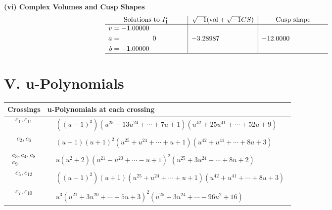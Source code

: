 \documentclass[1p]{elsarticle_modified}
\theoremstyle{definition}
\newcommand{\I}{\sqrt{-1}}
\begin{document}
\newpage\flushleft \textbf{(vi) Complex Volumes and Cusp Shapes}
$$\begin{array}{c|c|c}  
\text{Solutions to }I^v_{1}& \I (\text{vol} + \sqrt{-1}CS) & \text{Cusp shape}\\
 \hline 
\begin{aligned}
v &= -1.00000\phantom{ +0.000000I} \\
a &= \phantom{-0.000000 } 0 \\
b &= -1.00000\phantom{ +0.000000I}\end{aligned}
 & -3.28987\phantom{ +0.000000I} & -12.0000\phantom{ +0.000000I}\\
 \hline 
 \end{array}$$\newpage
\newpage\renewcommand{\arraystretch}{1}
\centering \section*{ V. u-Polynomials}
\begin{tabular}{m{50pt}|m{274pt}}
Crossings & \hspace{64pt}u-Polynomials at each crossing \\
\hline $$\begin{aligned}c_{1},c_{11}\end{aligned}$$&$\begin{aligned}
&((u-1)^3)(u^{25}+13 u^{24}+\cdots+7 u+1)(u^{42}+25 u^{41}+\cdots+52 u+9)
\end{aligned}$\\
\hline $$\begin{aligned}c_{2},c_{6}\end{aligned}$$&$\begin{aligned}
&(u-1)(u+1)^2(u^{25}+u^{24}+\cdots+u+1)(u^{42}+u^{41}+\cdots+8 u+3)
\end{aligned}$\\
\hline $$\begin{aligned}c_{3},c_{4},c_{8}\\c_{9}\end{aligned}$$&$\begin{aligned}
&u(u^2+2)(u^{21}- u^{20}+\cdots- u+1)^{2}(u^{25}+3 u^{24}+\cdots+8 u+2)
\end{aligned}$\\
\hline $$\begin{aligned}c_{5},c_{12}\end{aligned}$$&$\begin{aligned}
&((u-1)^2)(u+1)(u^{25}+u^{24}+\cdots+u+1)(u^{42}+u^{41}+\cdots+8 u+3)
\end{aligned}$\\
\hline $$\begin{aligned}c_{7},c_{10}\end{aligned}$$&$\begin{aligned}
&u^3(u^{21}+3 u^{20}+\cdots+5 u+3)^{2}(u^{25}+3 u^{24}+\cdots-96 u^2+16)
\end{aligned}$\\
\hline
\end{tabular}\newpage\renewcommand{\arraystretch}{1}
\end{document}
